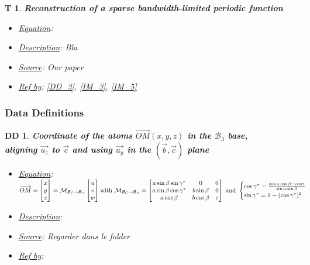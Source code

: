 \documentclass[12pt]{article}
\newtheorem{T}{T}
\newtheorem{DD}{DD}
\begin{document}
\begin{T}
\label{T_4}
\noindent\colorbox{shadecolorT}{\normalfont \textbf{Reconstruction of a sparse bandwidth-limited periodic function}}
\normalfont
\begin{itemize}
\item \underline{Equation}: 
\item \underline{Description}: Bla
\item \underline{Source}: Our paper
\item \underline{Ref by}: \cref{DD_3}, \cref{IM_3}, \cref{IM_5}
\end{itemize}
\end{T}

\subsubsection{Data Definitions}\label{sec_datadef}

\renewcommand{\labelitemi}{$\star$}

\begin{DD}
\label{DD_1}
\noindent\colorbox{shadecolorDD}{\normalfont \textbf{Coordinate of the atoms $ \overrightarrow{OM}(x,y,z)$ in the $\mathcal{B}_3$ base, \\ aligning $\vec{u_z}$ to $\vec{c}$ and using $\vec{u_y}$ in the $(\vec{b}, \vec{c})$ plane}}
\normalfont
\begin{itemize}
\item \underline{Equation}:  $ \overrightarrow{OM} = 
\begin{bmatrix}
 x \\
y \\
z 
\end{bmatrix} =  \mathcal{M_{\mathcal{B}_C\rightarrow \mathcal{B}_3}} 
\begin{bmatrix}
u \\
v \\
w 
\end{bmatrix} \\ 
\text{with} \ \mathcal{M_{\mathcal{B}_C\rightarrow \mathcal{B}_3}}  = 
\begin{bmatrix}
a\sin{\beta}\sin{\gamma^{*}} & 0 & 0 \\
a\sin{\beta}\cos{\gamma^{*}} & b\sin{\beta} & 0 \\
a\cos{\beta} & b\cos{\beta} & c
\end{bmatrix} \ \text{and} \ 
\begin{cases}
\cos{\gamma^{*}} =  \frac{\cos{\alpha}\cos{\beta} - cos{\gamma}}{\sin{\alpha}\sin{\beta}} \\
\sin{\gamma^{*}} = 1 - (\cos{\gamma^{*}})^{2}
\end{cases}$
\item \underline{Description}: 
\item \underline{Source}: Regarder dans le folder
\item \underline{Ref by}: 
\end{itemize}
\end{DD}
\end{document}
